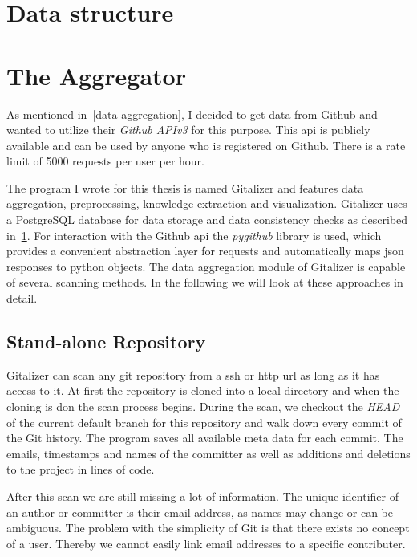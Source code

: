 \section{Data structure}\label{data-structure}


\section{The Aggregator}

As mentioned in~\ref{data-aggregation}, I decided to get data from Github and wanted to utilize their \emph{Github APIv3} for this purpose.
This \ac{api} is publicly available and can be used by anyone who is registered on Github.
There is a rate limit of 5000 requests per user per hour.

The program I wrote for this thesis is named Gitalizer and features data aggregation, preprocessing, knowledge extraction and visualization.
Gitalizer uses a PostgreSQL database for data storage and data consistency checks as described in~\ref{data-structure}.
For interaction with the Github \ac{api} the \emph{pygithub} library is used, which provides a convenient abstraction layer for requests and automatically maps \ac{json} responses to python objects.
The data aggregation module of Gitalizer is capable of several scanning methods. In the following we will look at these approaches in detail.

\subsection{Stand-alone Repository}\label{stand-alone-repository-scan}
Gitalizer can scan any git repository from a \ac{ssh} or \ac{http} \acs{url} as long as it has access to it.
At first the repository is cloned into a local directory and when the cloning is don the scan process begins.
During the scan, we checkout the \emph{HEAD} of the current default branch for this repository and walk down every commit of the Git history.
The program saves all available meta data for each commit.
The emails, timestamps and names of the committer as well as additions and deletions to the project in lines of code.

After this scan we are still missing a lot of information.
The unique identifier of an author or committer is their email address, as names may change or can be ambiguous.
The problem with the simplicity of Git is that there exists no concept of a user.
Thereby we cannot easily link email addresses to a specific contributer.


